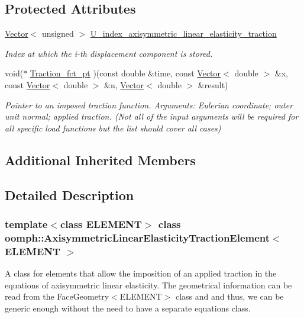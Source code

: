\subsection*{Protected Attributes}
\begin{DoxyCompactItemize}
\item 
\hyperlink{classoomph_1_1Vector}{Vector}$<$ unsigned $>$ \hyperlink{classoomph_1_1AxisymmetricLinearElasticityTractionElement_a2b4e580e5a53714c55b606575ad89669}{U\+\_\+index\+\_\+axisymmetric\+\_\+linear\+\_\+elasticity\+\_\+traction}
\begin{DoxyCompactList}\small\item\em Index at which the i-\/th displacement component is stored. \end{DoxyCompactList}\item 
void($\ast$ \hyperlink{classoomph_1_1AxisymmetricLinearElasticityTractionElement_a4e8f5cdb73984c400c4297a0f963a520}{Traction\+\_\+fct\+\_\+pt} )(const double \&time, const \hyperlink{classoomph_1_1Vector}{Vector}$<$ double $>$ \&x, const \hyperlink{classoomph_1_1Vector}{Vector}$<$ double $>$ \&n, \hyperlink{classoomph_1_1Vector}{Vector}$<$ double $>$ \&result)
\begin{DoxyCompactList}\small\item\em Pointer to an imposed traction function. Arguments\+: Eulerian coordinate; outer unit normal; applied traction. (Not all of the input arguments will be required for all specific load functions but the list should cover all cases) \end{DoxyCompactList}\end{DoxyCompactItemize}
\subsection*{Additional Inherited Members}


\subsection{Detailed Description}
\subsubsection*{template$<$class E\+L\+E\+M\+E\+NT$>$\newline
class oomph\+::\+Axisymmetric\+Linear\+Elasticity\+Traction\+Element$<$ E\+L\+E\+M\+E\+N\+T $>$}

A class for elements that allow the imposition of an applied traction in the equations of axisymmetric linear elasticity. The geometrical information can be read from the Face\+Geometry$<$\+E\+L\+E\+M\+E\+N\+T$>$ class and and thus, we can be generic enough without the need to have a separate equations class. 

